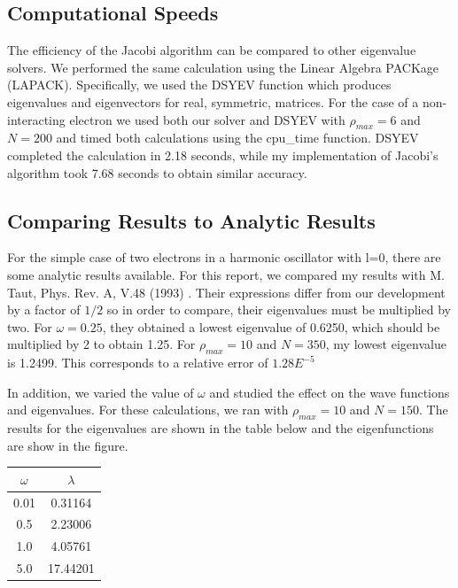 \documentclass[%
oneside,                 %
final,                   %
10pt]{article}
\begin{document}
\subsection{Computational Speeds}

The efficiency of the Jacobi algorithm can be compared to other eigenvalue solvers.  We performed the same calculation using the Linear Algebra PACKage (LAPACK).  Specifically, we used the DSYEV function which produces eigenvalues and eigenvectors for real, symmetric, matrices.  For the case of a non-interacting electron we used both our solver and DSYEV with $\rho_{max}=6$ and $N=200$ and timed both calculations using the cpu\_time function.  DSYEV completed the calculation in 2.18 seconds, while my implementation of Jacobi's algorithm took 7.68 seconds to obtain similar accuracy.

\subsection{Comparing Results to Analytic Results}

For the simple case of two electrons in a harmonic oscillator with l=0, there are some analytic results available.  For this report, we compared my results with M. Taut, Phys. Rev. A, V.48 (1993) \cite{taut}.  Their expressions differ from our development by a factor of $1/2$ so in order to compare, their eigenvalues must be multiplied by two.  For $\omega=0.25$, they obtained a lowest eigenvalue of 0.6250, which should be multiplied by 2 to obtain 1.25.  For $\rho_{max}=10$ and $N=350$, my lowest eigenvalue is 1.2499.  This corresponds to a relative error of $1.28 E^{-5}$

In addition, we varied the value of $\omega$ and studied the effect on the wave functions and eigenvalues.  For these calculations, we ran with $\rho_{max}=10$ and $N=150$.  The results for the eigenvalues are shown in the table below and the eigenfunctions are show in the figure.

\begin{center} 
\begin{tabular}{ |c|c| }
\hline
$\omega$ & $\lambda$ \\
\hline
0.01 & 0.31164 \\
0.5 & 2.23006 \\
1.0 & 4.05761 \\
5.0 & 17.44201\\
\hline
\end{tabular}
\label{table:test}
\end{center}
\end{document}
